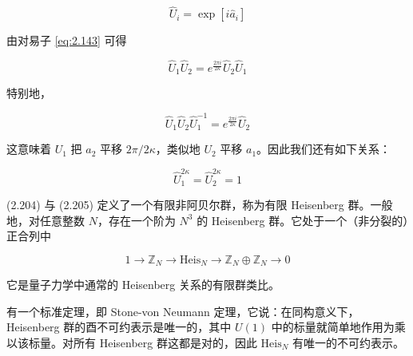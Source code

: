 \begin{equation}
  \widehat{U}_i=\exp[i\hat a_i]
  \tag{2.202}
  \label{eq:2.202}
\end{equation}

由对易子 \eqref{eq:2.143} 可得

\begin{equation}
  \widehat{U}_1\widehat{U}_2=e^{\frac{2\pi i}{2\kappa}}\widehat{U}_2\widehat{U}_1
  \tag{2.203}
  \label{eq:2.203}
\end{equation}

特别地，

\begin{equation}
  \widehat{U}_1\widehat{U}_2\widehat{U}_1^{-1}=e^{\frac{2\pi i}{2\kappa}}\widehat{U}_2
  \tag{2.204}
  \label{eq:2.204}
\end{equation}

这意味着 $U_1$ 把 $a_2$ 平移 $2\pi/2\kappa$，类似地 $U_2$ 平移 $a_1$。因此我们还有如下关系：

\begin{equation}
  \widehat{U}_1^{2\kappa}=\widehat{U}_2^{2\kappa}=1
  \tag{2.205}
  \label{eq:2.205}
\end{equation}

(2.204) 与 (2.205) 定义了一个有限非阿贝尔群，称为有限 Heisenberg 群。一般地，对任意整数 $N$，存在一个阶为 $N^3$ 的 Heisenberg 群。它处于一个（非分裂的）正合列中

\begin{equation}
  1\to\mathbb{Z}_N\to\mathrm{Heis}_N\to\mathbb{Z}_N\oplus\mathbb{Z}_N\to 0
  \tag{2.206}
  \label{eq:2.206}
\end{equation}

它是量子力学中通常的 Heisenberg 关系的有限群类比。

有一个标准定理，即 Stone-von Neumann 定理，它说：在同构意义下，Heisenberg 群的酉不可约表示是唯一的，其中 $U(1)$ 中的标量就简单地作用为乘以该标量。对所有 Heisenberg 群这都是对的，因此 $\mathrm{Heis}_N$ 有唯一的不可约表示。

